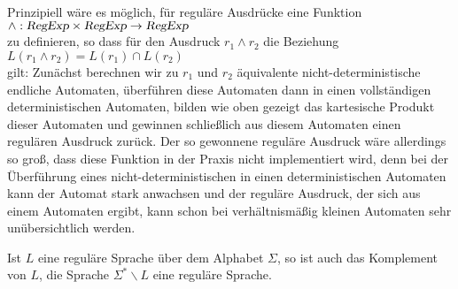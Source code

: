 \remark
Prinzipiell w\"are es m\"oglich, f\"ur regul\"are Ausdr\"ucke eine Funktion 
\\[0.2cm]
\hspace*{1.3cm}
$\wedge: \textsl{RegExp} \times \textsl{RegExp} \rightarrow \textsl{RegExp}$
\\[0.2cm]
zu definieren, so dass f\"ur den Ausdruck $r_1 \wedge r_2$ die Beziehung
\\[0.2cm]
\hspace*{1.3cm}
$L(r_1 \wedge r_2) = L(r_1) \cap L(r_2)$
\\[0.2cm]
gilt:  Zun\"achst berechnen wir zu $r_1$ und $r_2$ \"aquivalente nicht-deterministische
endliche Automaten, \"uberf\"uhren diese Automaten dann in einen vollst\"andigen
deterministischen Automaten, bilden wie oben gezeigt das kartesische Produkt dieser
Automaten und gewinnen schlie{\ss}lich aus diesem Automaten einen regul\"aren 
Ausdruck zur\"uck.  Der so gewonnene regul\"are Ausdruck w\"are allerdings so gro{\ss},
dass diese Funktion in der Praxis nicht implementiert wird, denn bei der \"Uberf\"uhrung
eines nicht-deterministischen in einen deterministischen Automaten kann der Automat
stark anwachsen und der regul\"are Ausdruck, der sich aus einem Automaten ergibt, kann schon
bei verh\"altnism\"a{\ss}ig kleinen Automaten sehr un\"ubersichtlich werden.

\begin{Satz}
  Ist $L$ eine regul\"are Sprache \"uber dem Alphabet $\Sigma$, so ist auch das Komplement
  von $L$, die Sprache $\Sigma^* \backslash L$ eine regul\"are Sprache.
\end{Satz}

